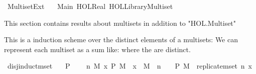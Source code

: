 %
\begin{isabellebody}%
%
%
\isadelimdocument
%
\endisadelimdocument
%
\isatagdocument
%
\isamarkuptrue%
%
\endisatagdocument
{\isafolddocument}%
%
\isadelimdocument
%
\endisadelimdocument
%
\isadelimtheory
%
\endisadelimtheory
%
\isatagtheory
{}\isamarkupfalse%
\ Multiset{\isacharunderscore}{\kern0pt}Ext\isanewline
\ \ \ Main\ {\isachardoublequoteopen}HOL{\isachardot}{\kern0pt}Real{\isachardoublequoteclose}\ {\isachardoublequoteopen}HOL{\isacharminus}{\kern0pt}Library{\isachardot}{\kern0pt}Multiset{\isachardoublequoteclose}\isanewline
{}%
\endisatagtheory
{\isafoldtheory}%
%
\isadelimtheory
%
\endisadelimtheory
%
\begin{isamarkuptext}%
This section contains results about multisets in addition to "HOL.Multiset"%
\end{isamarkuptext}\isamarkuptrue%
%
\begin{isamarkuptext}%
This is a induction scheme over the distinct elements of a multisets: 
We can represent each multiset as a sum like: 
 where the 
 are distinct.%
\end{isamarkuptext}\isamarkuptrue%
\isamarkupfalse%
\ disj{\isacharunderscore}{\kern0pt}induct{\isacharunderscore}{\kern0pt}mset{\isacharcolon}{\kern0pt}\isanewline
\ \ \ {\isachardoublequoteopen}P\ {\isacharbraceleft}{\kern0pt}{\isacharhash}{\kern0pt}{\isacharbraceright}{\kern0pt}{\isachardoublequoteclose}\isanewline
\ \ \ {\isachardoublequoteopen}{\isasymAnd}n\ M\ x{\isachardot}{\kern0pt}\ P\ M\ {\isasymLongrightarrow}\ {\isasymnot}{\isacharparenleft}{\kern0pt}x\ {\isasymin}{\isacharhash}{\kern0pt}\ M{\isacharparenright}{\kern0pt}\ {\isasymLongrightarrow}\ n\ {\isachargreater}{\kern0pt}\ {}\ {\isasymLongrightarrow}\ P\ {\isacharparenleft}{\kern0pt}M\ {\isacharplus}{\kern0pt}\ replicate{\isacharunderscore}{\kern0pt}mset\ n\ x{\isacharparenright}{\kern0pt}{\isachardoublequoteclose}\isanewline

\end{isabellebody}

